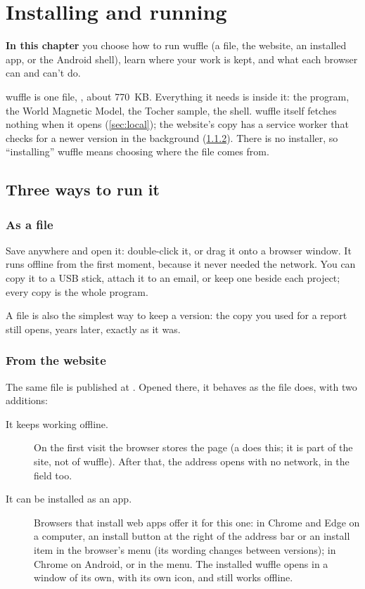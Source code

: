 \chapter{Installing and running}\label{ch:install}
\begin{goals}
\textbf{In this chapter} you choose how to run wuffle (a file, the website, an installed app, or the
Android shell), learn where your work is kept, and what each browser can and can't do.
\end{goals}

wuffle is one file, , about 770~KB. Everything it needs is inside it: the program, the
World Magnetic Model, the Tocher sample, the shell. wuffle itself fetches nothing when it opens
(\cref{sec:local}); the website's copy has a service worker that checks for a newer version in the
background (\cref{sec:run-site}). There is no installer, so \enquote{installing} wuffle means choosing
where the file comes from.

\section{Three ways to run it}\label{sec:run-ways}

\subsection{As a file}

Save  anywhere and open it: double-click it, or drag it onto a browser window. It runs
offline from the first moment, because it never needed the network. You can copy it to a USB stick,
attach it to an email, or keep one beside each project; every copy is the whole program.

A file is also the simplest way to keep a version: the copy you used for a report still opens, years
later, exactly as it was.

\subsection{From the website}\label{sec:run-site}

The same file is published at . Opened there, it behaves as the file does,
with two additions:

\begin{description}
\item[It keeps working offline.] On the first visit the browser stores the page (a  does this; it is part of the site, not of wuffle). After that, the address opens with no
network, in the field too.
\item[It can be installed as an app.] Browsers that install web apps offer
it for this one: in Chrome and Edge on a computer, an install button at the right of the address bar or
an install item in the browser's menu (its wording changes between versions); in Chrome on Android,
 or  in the menu. The installed wuffle opens in a window of its
own, with its own icon, and still works offline.
\end{description}

